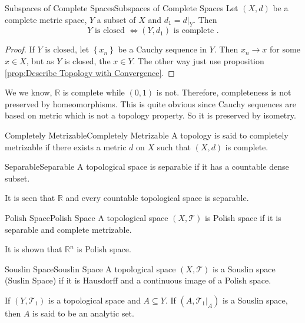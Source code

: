 \documentclass[../main.tex]{subfiles}
\begin{document}
\begin{proposition}{Subspaces of Complete Spaces}{Subspaces of Complete Spaces}
Let $(X,d)$ be a complete metric space, $Y$ a subset of $X$ and $d_1 = d|_Y$. Then
\begin{equation*}
Y \text{ is closed }\Leftrightarrow (Y,d_1) \text{ is complete }.
\end{equation*}
\end{proposition}
\begin{proof}
If $Y$ is closed, let $\left\{ x_n \right\}$ be a Cauchy sequence in $Y$. Then $x_n \rightarrow x$ for some $x\in X$, but as $Y$ is closed, the  $x\in Y$. The other way just use proposition \ref{prop:Describe Topology with Convergence}.
\end{proof}

\begin{remark}
We we know, $\mathbb{R}$ is complete while $(0,1)$ is not. Therefore, completeness is not preserved by homeomorphisms. This is quite obvious since Cauchy sequences are based on metric which is not a topology property. So it is preserved by isometry.
\end{remark}

\begin{definition}{Completely Metrizable}{Completely Metrizable}
A topology is said to completely metrizable if there exists a metric $d$ on $X$ such that $(X,d)$ is complete.
\end{definition}

\begin{definition}{Separable}{Separable}
A topological space is separable if it has a countable dense subset.
\end{definition}
It is seen that  $\mathbb{R}$ and every countable topological space is separable.

\begin{definition}{Polish Space}{Polish Space}
A topological space $(X,\mathcal{T})$ is Polish space if it is separable and complete metrizable.
\end{definition}
It is shown that $\mathbb{R}^n$ is Polish space.

\begin{definition}{Souslin Space}{Souslin Space}
A  topological space $(X,\mathcal{T})$ is a Souslin space (Suslin Space) if it is Hausdorff and a continuous image of a Polish space.

If $(Y, \mathcal{T}_1)$ is a topological space and $A \subseteq Y$. If $(A, \mathcal{T}_1|_A)$ is a Souslin space, then $A$ is said to be an analytic set.
\end{definition}
\end{document}
